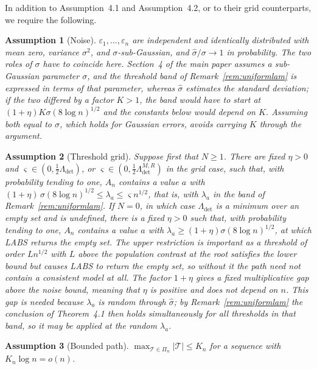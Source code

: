 \documentclass[12pt, a4paper]{article}
\newtheorem{assumption}{Assumption}[section]
\newcommand{\mainthm}{Theorem~4.1}
\newcommand{\assterm}{Assumption~4.1}
\newcommand{\assnondeg}{Assumption~4.2}
\begin{document}
In addition to \assterm{} and \assnondeg{}, or to their grid counterparts, we
require the following.

\begin{assumption}[Noise]
\label{ass:ssicnoise}
$\varepsilon_1,\ldots,\varepsilon_n$ are independent and identically distributed with mean zero, variance $\sigma^2$, and $\sigma$-sub-Gaussian, and $\hat\sigma/\sigma \to 1$ in probability. The two roles of $\sigma$ have to coincide here. Section~4 of the main paper assumes a sub-Gaussian parameter $\sigma$, and the threshold band of Remark~\ref{rem:uniformlam} is expressed in terms of that parameter, whereas $\hat\sigma$ estimates the standard deviation; if the two differed by a factor $K > 1$, the band would have to start at $(1+\eta)K\sigma(8\log n)^{1/2}$ and the constants below would depend on $K$. Assuming both equal to $\sigma$, which holds for Gaussian errors, avoids carrying $K$ through the argument.
\end{assumption}

\begin{assumption}[Threshold grid]
\label{ass:ssicgrid}
Suppose first that $N \ge 1$. There are fixed $\eta > 0$ and $\varsigma \in (0, \tfrac12\Lambda_{\mathrm{det}})$, or $\varsigma \in (0,\tfrac12\Lambda^{M,R}_{\mathrm{det}})$ in the grid case, such that, with probability tending to one, $A_n$ contains a value $a$ with $(1+\eta)\,\sigma(8\log n)^{1/2} \le \lambda_a \le \varsigma n^{1/2}$, that is, with $\lambda_a$ in the band of Remark~\ref{rem:uniformlam}. If $N = 0$, in which case $\Lambda_{\mathrm{det}}$ is a minimum over an empty set and is undefined, there is a fixed $\eta > 0$ such that, with probability tending to one, $A_n$ contains a value $a$ with $\lambda_a \ge (1+\eta)\sigma(8\log n)^{1/2}$, at which LABS returns the empty set. The upper restriction is important as a threshold of order $L n^{1/2}$ with $L$ above the population contrast at the root satisfies the lower bound but causes LABS to return the empty set, so without it the path need not contain a consistent model at all. The factor $1+\eta$ gives a fixed multiplicative gap above the noise bound, meaning that $\eta$ is positive and does not depend on $n$. This gap is needed because $\lambda_a$ is random through $\hat\sigma$; by Remark~\ref{rem:uniformlam} the conclusion of \mainthm{} then holds simultaneously for all thresholds in that band, so it may be applied at the random $\lambda_a$.
\end{assumption}

\begin{assumption}[Bounded path]
\label{ass:ssicpath}
$\max_{\mathcal{T} \in \Pi_n} |\mathcal{T}| \le K_n$ for a sequence with
$K_n \log n = o(n)$.
\end{assumption}
\end{document}
